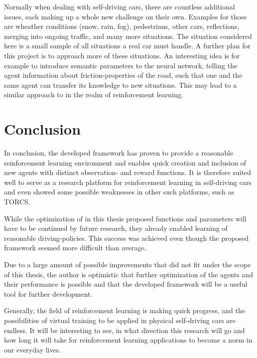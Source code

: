 Normally when dealing with self-driving cars, there are countless additional issues, each making up a whole new challenge on their own. Examples for those are wheather conditions (snow, rain, fog), pedestrians, other cars, reflections, merging into ongoing traffic, and many more situations. The situation considered here is a small sample of all situations a real car must handle. A further plan for this project is to approach more of these situations. An interesting idea is for example to introduce semantic parameters to the neural network, telling the agent information about friction-properties of the road, such that one and the same agent can transfer its knowledge to new situations. This may lead to a similar approach to \cite{chen_infogan:_2016} in the realm of reinforcement learning.

\section {Conclusion}

In conclusion, the developed framework has proven to provide a reasonable reinforcement learning environment and enables quick creation and inclusion of new agents with distinct observation- and reward functions. It is therefore suited well to serve as a research platform for reinforcement learning in self-driving cars and even showed some possible weaknesses in other such platforms, such as TORCS. 

While the optimization of in this thesis proposed functions and parameters will have to be continued by future research, they already enabled learning of reasonable driving-policies. This success was achieved even though the proposed framework seemed more difficult than average.

Due to a large amount of possible improvements that did not fit under the scope of this thesis, the author is optimistic that further optimization of the agents and their performance is possible and that the developed framework will be a useful tool for further development. 

Generally, the field of reinforcement learning is making quick progress, and the possibilities of virtual training to be applied in physical self-driving cars are endless.
It will be interesting to see, in what direction this research will go and how long it will take for reinforcement learning applications to become a norm in our everyday lives.  



